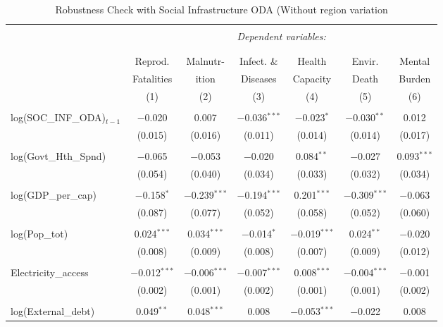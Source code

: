 \renewcommand{\arraystretch}{0.85} %
\begin{longtable}{@{\extracolsep{-3pt}}lcccccc} 
\caption{Robustness Check with Social Infrastructure ODA (Without region variation}
\\[-1.8ex]\hline 
\hline \\[-1.8ex] 
& \multicolumn{6}{c}{\textit{Dependent variables:}} \\ 
\cline{2-7} 
\\[-1.8ex] & \multicolumn{6}{c}{ } \\ 
 & Reprod. & Malnutr-  & Infect. \& & Health & Envir. & Mental\\
 & Fatalities & ition & Diseases & Capacity & Death & Burden \\
 & (1) & (2) & (3) & (4) & (5) & (6)\\ 
\hline \\[-1.8ex] 
log(SOC\_INF\_ODA)$_{t-1}$ & $-$0.020 & 0.007 & $-$0.036$^{***}$ & $-$0.023$^{*}$ & $-$0.030$^{**}$ & 0.012 \\ 
  & (0.015) & (0.016) & (0.011) & (0.014) & (0.014) & (0.017) \\ 
  & & & & & & \\ 
 log(Govt\_Hth\_Spnd) & $-$0.065 & $-$0.053 & $-$0.020 & 0.084$^{**}$ & $-$0.027 & 0.093$^{***}$ \\ 
  & (0.054) & (0.040) & (0.034) & (0.033) & (0.032) & (0.034) \\ 
  & & & & & & \\ 
 log(GDP\_per\_cap) & $-$0.158$^{*}$ & $-$0.239$^{***}$ & $-$0.194$^{***}$ & 0.201$^{***}$ & $-$0.309$^{***}$ & $-$0.063 \\ 
  & (0.087) & (0.077) & (0.052) & (0.058) & (0.052) & (0.060) \\ 
  & & & & & & \\ 
 log(Pop\_tot) & 0.024$^{***}$ & 0.034$^{***}$ & $-$0.014$^{*}$ & $-$0.019$^{***}$ & 0.024$^{**}$ & $-$0.020 \\ 
  & (0.008) & (0.009) & (0.008) & (0.007) & (0.009) & (0.012) \\ 
  & & & & & & \\ 
 Electricity\_access & $-$0.012$^{***}$ & $-$0.006$^{***}$ & $-$0.007$^{***}$ & 0.008$^{***}$ & $-$0.004$^{***}$ & $-$0.001 \\ 
  & (0.002) & (0.001) & (0.002) & (0.001) & (0.001) & (0.002) \\ 
  & & & & & & \\ 
 log(External\_debt) & 0.049$^{**}$ & 0.048$^{***}$ & 0.008 & $-$0.053$^{***}$ & $-$0.022 & 0.008 \\ 

\end{longtable}
